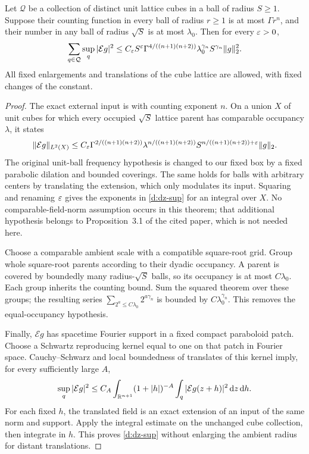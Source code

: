 \begin{theorem}
\label{d:dz-input}
Let $\mathcal Q$ be a collection of distinct unit lattice cubes in a
ball of radius $S\ge1$.  Suppose their counting function in every ball
of radius $r\ge1$ is at most $\Gamma r^n$, and their number in any ball
of radius $\sqrt S$ is at most $\lambda_0$.  Then for every $\varepsilon>0$,
\begin{equation}
 \sum_{q\in\mathcal Q}\sup_q|\mathcal E g|^2
 \le C_\varepsilon S^{\varepsilon}
       \Gamma^{4/((n+1)(n+2))}\lambda_0^{\gamma_n}
       S^{\gamma_n}\lVert g\rVert_2^2.
 \label{d:dz-sup}
\end{equation}
All fixed enlargements and translations of the cube lattice are
allowed, with fixed changes of the constant.
\end{theorem}

\begin{proof}
The exact external input is \citet[Theorem~1.6]{DuZhang2019} with counting
exponent $n$.  On a union $X$ of unit cubes for which every occupied
$\sqrt S$ lattice parent has comparable occupancy $\lambda$, it states
\[
 \lVert \mathcal E g\rVert_{L^2(X)}
 \le C_\varepsilon\Gamma^{2/((n+1)(n+2))}
       \lambda^{n/((n+1)(n+2))}
       S^{n/((n+1)(n+2))+\varepsilon}\lVert g\rVert_2.
\]
The original unit-ball frequency hypothesis is changed to our fixed
box by a fixed parabolic dilation and bounded coverings.  The same
holds for balls with arbitrary centers by translating the extension,
which only modulates its input.  Squaring and renaming $\varepsilon$ gives
the exponents in \eqref{d:dz-sup} for an integral over $X$.
No comparable-field-norm assumption occurs in this theorem; that
additional hypothesis belongs to Proposition~3.1 of the cited paper,
which is not needed here.

Choose a comparable ambient scale with a compatible square-root grid.
Group whole square-root parents according to their dyadic occupancy.
A parent is covered by boundedly many radius-$\sqrt S$ balls, so its
occupancy is at most $C\lambda_0$.  Each group inherits the counting
bound.  Sum the squared theorem over these groups; the resulting series
$\sum_{2^a\le C\lambda_0}2^{a\gamma_n}$ is bounded by
$C\lambda_0^{\gamma_n}$.  This removes the equal-occupancy hypothesis.

Finally, $\mathcal E g$ has spacetime Fourier support in a fixed compact
paraboloid patch.  Choose a Schwartz reproducing kernel equal to one
on that patch in Fourier space.  Cauchy--Schwarz and local boundedness
of translates of this kernel imply, for every sufficiently large $A$,
\[
 \sup_q|\mathcal E g|^2
 \le C_A\int_{\mathbb R^{n+1}}(1+|h|)^{-A}
            \int_q|\mathcal E g(z+h)|^2\,\mathrm d z\,\mathrm d h.
\]
For each fixed $h$, the translated field is an exact extension of an
input of the same norm and support.  Apply the integral estimate on
the unchanged cube collection, then integrate in $h$.  This proves
\eqref{d:dz-sup} without enlarging the ambient radius for distant
translations.
\end{proof}

